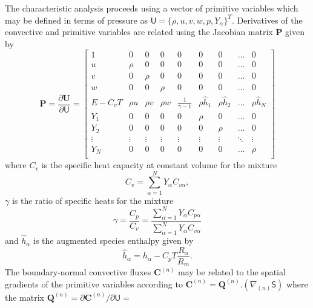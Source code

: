 \documentclass[dvips]{article}
\begin{document}
The characteristic analysis proceeds using a vector of primitive variables
which may be defined in terms of pressure as
${\mathsf U} = \{\rho, u, v, w, p, Y_{\alpha}\}^{T}$.  Derivatives
of the convective and primitive variables are related using the Jacobian
matrix ${\mathbf P}$ given by
\begin{equation}
{\mathbf P} = \frac{\partial {\mathbf U}}{\partial {\mathsf U}} =
\left[
\begin{array}{ccccccccc}
1 & 0 & 0 & 0 & 0 & 0 & 0 & \ldots & 0 \\
u & \rho & 0 & 0 & 0 & 0 & 0 & \ldots & 0 \\
v & 0 & \rho & 0 & 0 & 0 & 0 & \ldots & 0 \\
w & 0 & 0 & \rho & 0 & 0 & 0 & \ldots & 0 \\
E-C_{v}T & \rho u & \rho v & \rho w & \frac{1}{\gamma -1} &
\rho \hat{h}_{1} & \rho \hat{h}_{2} & \ldots & \rho \hat{h}_{N} \\
Y_{1} & 0 & 0 & 0 & 0 & \rho & 0 & \ldots & 0 \\
Y_{2} & 0 & 0 & 0 & 0 & 0 & \rho & \ldots & 0 \\
\vdots & \vdots & \vdots & \vdots & \vdots & \vdots & \vdots & \ddots &
\vdots \\
Y_{N} & 0 & 0 & 0 & 0 & 0 & 0 & \ldots & \rho \\
\end{array}
\right]
\end{equation}
where $C_{v}$ is the specific heat capacity at constant
volume for the mixture
\begin{equation}
C_{v} = \sum_{\alpha=1}^{N} Y_{\alpha}C_{v\alpha},
\end{equation}
$\gamma$ is the ratio of specific heats for the mixture
\begin{equation}
\gamma = \frac{C_{p}}{C_{v}}
       = \frac{\sum_{\alpha=1}^{N} Y_{\alpha}C_{p\alpha}}
              {\sum_{\alpha=1}^{N} Y_{\alpha}C_{v\alpha}}
\end{equation}
and $\hat{h}_{\alpha}$ is the augmented species enthalpy given by
\begin{equation}
\hat{h}_{\alpha} = h_{\alpha} - C_{p}T\frac{R_{\alpha}}{R_{m}}.
\end{equation}
The boundary-normal convective fluxes ${\mathbf C^{(n)}}$ may be related to the
spatial gradients of the primitive variables according to
${\mathbf C}^{(n)}={\mathbf Q}^{(n)}.\left(\nabla_{(n)}{\mathsf S}\right)$
where the matrix
${\mathbf Q}^{(n)} = \partial {\mathbf C}^{(n)}/\partial {\mathsf U} = $
\end{document}
